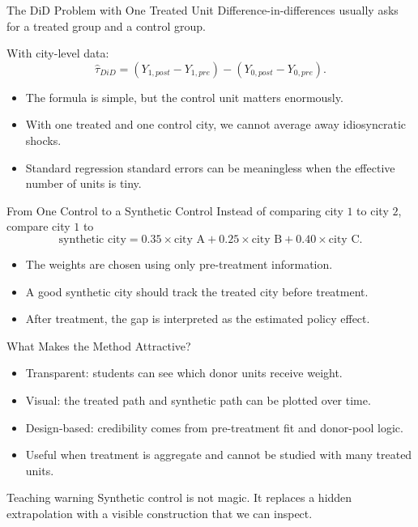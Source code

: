 \documentclass[11pt,aspectratio=169]{beamer}
\begin{document}
\begin{frame}{The DiD Problem with One Treated Unit}
  Difference-in-differences usually asks for a treated group and a control group.
  \vspace{0.3em}

  With city-level data:
  \[
    \widehat{\tau}_{DiD}
    =
    (Y_{1,post}-Y_{1,pre})-(Y_{0,post}-Y_{0,pre}).
  \]
  \begin{itemize}
    \item The formula is simple, but the control unit matters enormously.
    \item With one treated and one control city, we cannot average away idiosyncratic shocks.
    \item Standard regression standard errors can be meaningless when the effective number of units is tiny.
  \end{itemize}
\end{frame}

\begin{frame}{From One Control to a Synthetic Control}
  Instead of comparing city \(1\) to city \(2\), compare city \(1\) to
  \[
    \text{synthetic city}
    =
    0.35 \times \text{city A}
    +
    0.25 \times \text{city B}
    +
    0.40 \times \text{city C}.
  \]
  \begin{itemize}
    \item The weights are chosen using only pre-treatment information.
    \item A good synthetic city should track the treated city before treatment.
    \item After treatment, the gap is interpreted as the estimated policy effect.
  \end{itemize}
\end{frame}

\begin{frame}{What Makes the Method Attractive?}
  \begin{itemize}
    \item Transparent: students can see which donor units receive weight.
    \item Visual: the treated path and synthetic path can be plotted over time.
    \item Design-based: credibility comes from pre-treatment fit and donor-pool logic.
    \item Useful when treatment is aggregate and cannot be studied with many treated units.
  \end{itemize}
  \begin{block}{Teaching warning}
    Synthetic control is not magic. It replaces a hidden extrapolation with a visible construction that we can inspect.
  \end{block}
\end{frame}
\end{document}
